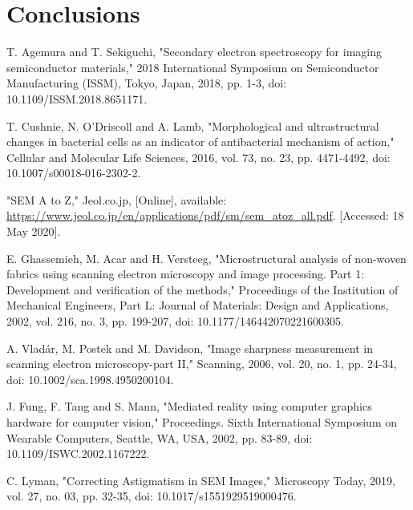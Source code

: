 \documentclass[12pt, conference]{IEEEtran}
\begin{document}
\section{Conclusions}

\begin{thebibliography}{00}
    T. Agemura and T. Sekiguchi, "Secondary electron spectroscopy for imaging semiconductor materials," 2018 International Symposium on Semiconductor Manufacturing (ISSM), Tokyo, Japan, 2018, pp. 1-3, doi: 10.1109/ISSM.2018.8651171.

    T. Cushnie, N. O’Driscoll and A. Lamb, "Morphological and ultrastructural changes in bacterial cells as an indicator of antibacterial mechanism of action," Cellular and Molecular Life Sciences, 2016, vol. 73, no. 23, pp. 4471-4492, doi: 10.1007/s00018-016-2302-2.

    "SEM A to Z," Jeol.co.jp, [Online], available: \url{https://www.jeol.co.jp/en/applications/pdf/sm/sem_atoz_all.pdf}. [Accessed: 18 May 2020].

    E. Ghassemieh, M. Acar and H. Versteeg, "Microstructural analysis of non-woven fabrics using scanning electron microscopy and image processing. Part 1: Development and verification of the methods," Proceedings of the Institution of Mechanical Engineers, Part L: Journal of Materials: Design and Applications, 2002, vol. 216, no. 3, pp. 199-207, doi: 10.1177/146442070221600305.

    A. Vladár, M. Postek and M. Davidson, "Image sharpness measurement in scanning electron microscopy-part II," Scanning, 2006, vol. 20, no. 1, pp. 24-34, doi: 10.1002/sca.1998.4950200104.

    J. Fung, F. Tang and S. Mann, "Mediated reality using computer graphics hardware for computer vision," Proceedings. Sixth International Symposium on Wearable Computers, Seattle, WA, USA, 2002, pp. 83-89, doi: 10.1109/ISWC.2002.1167222.

    C. Lyman, "Correcting Astigmatism in SEM Images," Microscopy Today, 2019, vol. 27, no. 03, pp. 32-35, doi: 10.1017/s1551929519000476.



\end{thebibliography}
\end{document}

